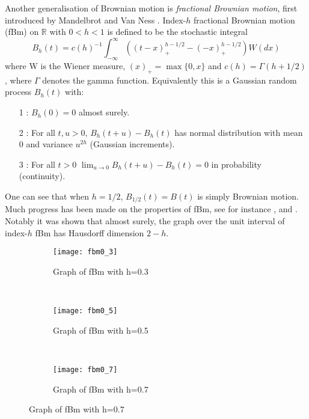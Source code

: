 \documentclass{amsart}
\begin{document}
Another generalisation of Brownian motion is \emph{fractional Brownian motion}, first introduced by Mandelbrot and Van Ness \cite{MVN}. Index-$h$ fractional Brownian motion (fBm) on $\mathbb{R}$ with $0<h<1$ is defined to be the stochastic integral 
\[
B_h (t) = c(h)^{-1} \int_{-\infty}^\infty \left(\left( t-x \right)_+^{h-1/2} - (-x)_+^{h-1/2} \right)W(dx)
\]
where W is the Wiener measure, $(x)_+ = \max\{0,x\}$ and $c(h) = \Gamma(h+1/2)$, where $\Gamma$ denotes the gamma function. Equivalently this is a Gaussian random process $B_h(t)$ with:
\begin{itemize}
	\item[1]: $B_h(0)=0$ almost surely.
	\item[2]: For all $t,u>0$, $B_h(t+u)-B_h(t)$ has normal distribution with mean 0 and variance $u^{2h}$ (Gaussian increments).
	\item[3]: For all $t>0$ $\lim_{u\to 0} B_h(t+u)-B_h(t)=0$ in probability (continuity).
\end{itemize}
One can see that when $h=1/2$, $B_{1/2}(t) = B(t)$ is simply Brownian motion. Much progress has been made on the properties of fBm, see for instance \cite{Ad},\cite{Ka} and \cite{Fa2}. Notably it was shown that almost surely, the graph over the unit interval of index-$h$ fBm has Hausdorff dimension $2-h$. 

\begin{figure}[h]
    \centering
    \begin{subfigure}[b]{0.3\textwidth}
        \texttt{[image: fbm0\_3]}
        \caption{Graph of fBm with h=0.3}
        \label{fig:fbm3}
    \end{subfigure}
    ~ %
    \begin{subfigure}[b]{0.3\textwidth}
        \texttt{[image: fbm0\_5]}
        \caption{Graph of fBm with h=0.5}
        \label{fig:fbm5}
    \end{subfigure}
    ~ %
    \begin{subfigure}[b]{0.3\textwidth}
        \texttt{[image: fbm0\_7]}
        \caption{Graph of fBm with h=0.7}
        \label{fig:fbm7}
    \end{subfigure}
\end{figure}
\end{document}
